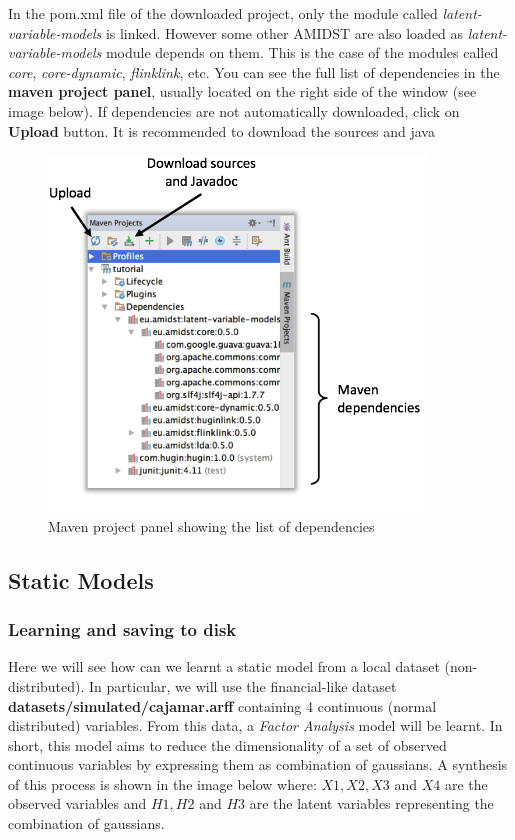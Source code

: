 \documentclass[10pt,a4paper]{article}
\begin{document}
In the pom.xml file of the downloaded project, only the module called \textit{latent-variable-models} is linked. However some other AMIDST are also loaded as \textit{latent-variable-models} module depends on them. This is the case of the modules called \textit{core}, \textit{core-dynamic}, \textit{flinklink}, etc. You can see the full list of dependencies in the \textbf{maven project panel}, usually located on the right side of the window (see image below). If dependencies are not automatically downloaded, click on \textbf{Upload} button. It is recommended to download the sources and java 


\begin{figure}[h!]
	\centering
	\includegraphics[width=10cm]{img/mavenpanel.png}
	\caption{Maven project panel showing the list of dependencies}
	\label{fig:lvmodels:mavenpanel}	
\end{figure}

\newpage 
\subsection{Static Models}\label{sec:lvmodels:static}
\subsubsection{Learning and saving to disk}\label{sec:lvmodels:static:learning}


Here we will see how can we learnt a static model from a local dataset (non-distributed). In particular, we will use the financial-like dataset \textbf{datasets/simulated/cajamar.arff} containing 4 continuous (normal distributed) variables. From this data,  a \textit{Factor Analysis} model will be learnt. In short, this model aims to reduce the dimensionality of a set of observed continuous variables by expressing them as combination of gaussians. A synthesis of this process is shown in the image below where: $X1, X2, X3$ and $X4$ are the observed variables and $H1, H2$ and $H3$ are the latent variables representing the combination of gaussians.
\end{document}

